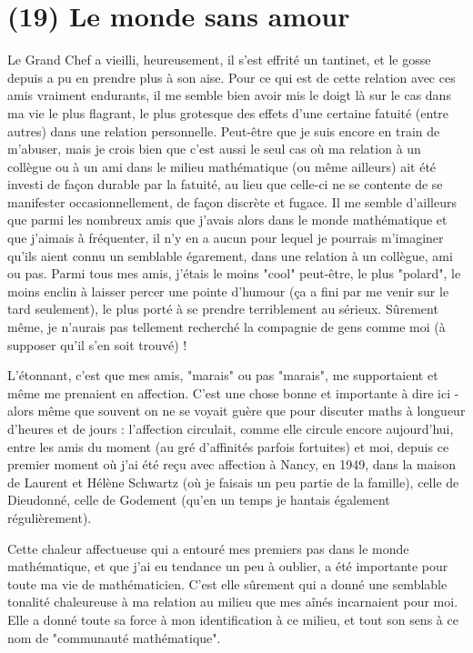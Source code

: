 \section{(19) Le monde sans amour}

Le Grand Chef a vieilli, heureusement, il s'est effrité un tantinet, et le gosse depuis a pu en prendre plus à son aise. Pour ce qui est de cette relation avec ces amis vraiment endurants, il me semble bien avoir mis le doigt là sur le cas dans ma vie le plus flagrant, le plus grotesque des effets d'une certaine fatuité (entre autres) dans une relation personnelle. Peut-être que je suis encore en train de m'abuser, mais je crois bien que c'est aussi le seul cas où ma relation à un collègue ou à un ami dans le milieu mathématique (ou même ailleurs) ait été investi de façon durable par la fatuité, au lieu que celle-ci ne se contente de se manifester occasionnellement, de façon discrète et fugace. Il me semble d'ailleurs que parmi les nombreux amis que j'avais alors dans le monde mathématique et que j'aimais à fréquenter, il n'y en a aucun pour lequel je pourrais m'imaginer qu'ils aient connu un semblable égarement, dans une relation à un collègue, ami ou pas. Parmi tous mes amis, j'étais le moins "cool" peut-être, le plus "polard", le moins enclin à laisser percer une pointe d'humour (ça a fini par me venir sur le tard seulement), le plus porté à se prendre terriblement au sérieux. Sûrement même, je n'aurais pas tellement recherché la compagnie de gens comme moi (à supposer qu'il s'en soit trouvé) !

L'étonnant, c'est que mes amis, "marais" ou pas "marais", me supportaient et même me prenaient en affection. C'est une chose bonne et importante à dire ici - alors même que souvent on ne se voyait guère que pour discuter maths à longueur d'heures et de jours : l'affection circulait, comme elle circule encore aujourd'hui, entre les amis du moment (au gré d'affinités parfois fortuites) et moi, depuis ce premier moment où j'ai été reçu avec affection à Nancy, en 1949, dans la maison de Laurent et Hélène Schwartz (où je faisais un peu partie de la famille), celle de Dieudonné, celle de Godement (qu'en un temps je hantais également régulièrement).

Cette chaleur affectueuse qui a entouré mes premiers pas dans le monde mathématique, et que j'ai eu tendance un peu à oublier, a été importante pour toute ma vie de mathématicien. C'est elle sûrement qui a donné une semblable tonalité chaleureuse à ma relation au milieu que mes aînés incarnaient pour moi. Elle a donné toute sa force à mon identification à ce milieu, et tout son sens à ce nom de "communauté mathématique".

